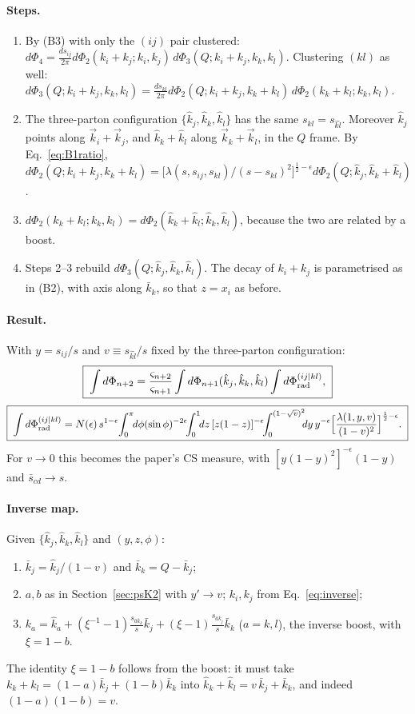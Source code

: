 \documentclass[11pt,a4paper]{article}
\newcommand{\jb}{\bar k_{j}}
\newcommand{\kb}{\bar k_{k}}
\newcommand{\jh}{\hat k_{j}}
\newcommand{\kh}{\hat k_{k}}
\newcommand{\lh}{\hat k_{l}}
\newcommand{\eps}{\epsilon}
\begin{document}
\paragraph{Steps.}
\begin{enumerate}
\item By (B3) with only the $(ij)$ pair clustered:
$d\Phi_4=\frac{ds_{ij}}{2\pi}d\Phi_2(k_i+k_j;k_i,k_j)\,d\Phi_3(Q;k_i\!+\!k_j,k_k,k_l)$.
Clustering $(kl)$ as well:
$d\Phi_3(Q;k_i\!+\!k_j,k_k,k_l)=\frac{ds_{kl}}{2\pi}d\Phi_2(Q;k_i\!+\!k_j,k_k\!+\!k_l)\,d\Phi_2(k_k\!+\!k_l;k_k,k_l)$.
\item The three-parton configuration $\{\jh,\kh,\lh\}$ has the same $s_{kl}=s_{\hat k\hat l}$. Moreover $\jh$ points along $\vec k_i+\vec k_j$,
and $\kh+\lh$ along $\vec k_k+\vec k_l$, in the $Q$ frame. By Eq.~\eqref{eq:B1ratio},
$d\Phi_2(Q;k_i\!+\!k_j,k_k\!+\!k_l)=\big[\lambda(s,s_{ij},s_{kl})/(s-s_{kl})^2\big]^{\frac12-\eps}d\Phi_2(Q;\jh,\kh\!+\!\lh)$.
\item $d\Phi_2(k_k\!+\!k_l;k_k,k_l)=d\Phi_2(\kh\!+\!\lh;\kh,\lh)$, because the two are related by a boost.
\item Steps 2--3 rebuild $d\Phi_3(Q;\jh,\kh,\lh)$. The decay of $k_i+k_j$ is parametrised as in (B2), with axis along $\kb$, so that $z=x_i$ as before.
\end{enumerate}

\paragraph{Result.} With $y=s_{ij}/s$ and $v\equiv s_{\hat k\hat l}/s$ fixed by the three-parton configuration:
\begin{equation}
\boxed{\;
\int d\Phi_{n+2}=\frac{\varsigma_{n+2}}{\varsigma_{n+1}}\int d\Phi_{n+1}(\jh,\kh,\lh)\int d\Phi_{\rm rad}^{(ij|kl)},\;}
\end{equation}
\begin{equation}
\boxed{\;\int d\Phi_{\rm rad}^{(ij|kl)}=N(\eps)\,s^{1-\eps}\!\int_0^\pi\!\!d\phi(\sin\phi)^{-2\eps}\!\!\int_0^1\!\!dz\,[z(1-z)]^{-\eps}\!\!
\int_0^{(1-\sqrt v)^2}\!\!\!dy\,y^{-\eps}\Big[\frac{\lambda(1,y,v)}{(1-v)^2}\Big]^{\frac12-\eps}.\;}
\label{eq:dPhiradK1}
\end{equation}
For $v\to0$ this becomes the paper's CS measure, with $[y(1-y)^2]^{-\eps}(1-y)$ and $\bar s_{cd}\to s$.

\paragraph{Inverse map.} Given $\{\jh,\kh,\lh\}$ and $(y,z,\phi)$:
\begin{enumerate}
\item $\jb=\jh/(1-v)$ and $\kb=Q-\jb$;
\item $a,b$ as in Section~\ref{sec:psK2} with $y'\to v$; $k_i,k_j$ from Eq.~\eqref{eq:inverse};
\item $k_a=\hat k_a+(\xi^{-1}-1)\frac{s_{\hat a\kb}}{s}\jb+(\xi-1)\frac{s_{\hat a\jb}}{s}\kb$ ($a=k,l$), the inverse boost, with $\xi=1-b$.
\end{enumerate}
The identity $\xi=1-b$ follows from the boost: it must take $k_k+k_l=(1-a)\jb+(1-b)\kb$ into $\kh+\lh=v\,\jb+\kb$, and indeed $(1-a)(1-b)=v$.
\end{document}
